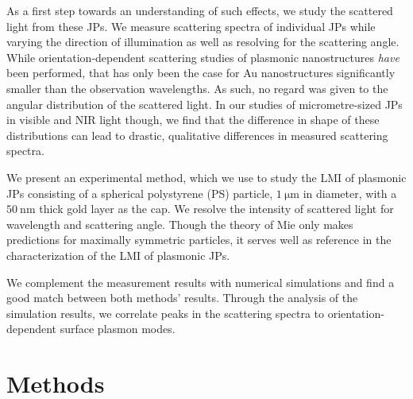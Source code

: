 \documentclass[10pt]{article}
\begin{document}
As a first step towards an understanding of such effects, we study the scattered light from these JPs. 
We measure scattering spectra of individual JPs while varying the direction of illumination as well as resolving for the scattering angle. 
While orientation-dependent scattering studies of plasmonic nanostructures %
\emph{have} been performed, \cite{Islam2021} %
that has only been the case for Au nanostructures significantly smaller than the observation wavelengths. 
As such, no regard was given to the angular distribution of the scattered light. %
In our studies of micrometre-sized JPs in visible and NIR light though, we find that the difference in shape of these distributions can lead to drastic, qualitative differences in measured scattering spectra. 

We present an experimental method, which we use to study the LMI of plasmonic JPs consisting of a spherical polystyrene (PS) particle, $\SI{1}{\micro\meter}$ in diameter, with a $\SI{50}{\nano\meter}$ thick gold layer as the cap. 
We resolve the intensity of scattered light for wavelength and scattering angle. 
Though the theory of Mie \cite{Mie1908} only makes predictions for maximally symmetric particles, it serves well as reference in the characterization of the LMI of plasmonic JPs. 

We complement the measurement results with numerical simulations and find a good match between both methods' results. 
Through the analysis of the simulation results, we correlate peaks in the scattering spectra to orientation-dependent surface plasmon modes. 









\section*{Methods}
\end{document}
